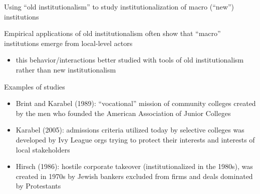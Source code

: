 \begin{frame}{Using ``old institutionalism'' to study institutionalization of macro (``new'') institutions}

	Empirical applications of old institutionalism often show that ``macro'' institutions emerge from local-level actors
	
	\begin{itemize}
		\item this behavior/interactions better studied with tools of old institutionalism rather than new institutionalism
	\end{itemize}

	\vspace{2mm}	
	Examples of studies
	\begin{itemize}
		\item Brint and Karabel (1989): ``vocational'' mission of community colleges created by the men who founded the American Association of Junior Colleges
		\item Karabel (2005): admissions criteria utilized today by selective colleges was developed by Ivy League orgs trying to protect their interests and interests of local stakeholders
		\item Hirsch (1986): hostile corporate takeover (institutionalized in the 1980s), was created in 1970s by Jewish bankers excluded from firms and deals dominated by Protestants 

	\end{itemize}

\end{frame}

